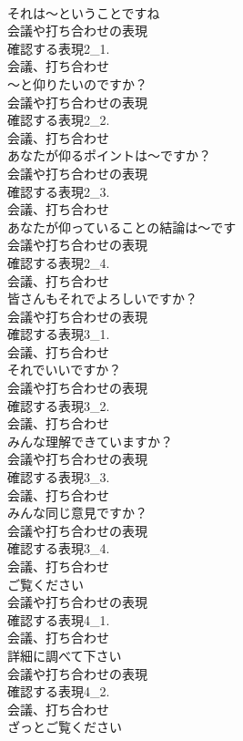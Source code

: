 \documentclass[8pt]{extreport}
\begin{document}
\begin{CJK}{UTF8}{min}
\\	それは～ということですね	
\\	会議や打ち合わせの表現
\\	確認する表現2_1.
\\	会議、打ち合わせ
\\	～と仰りたいのですか？	
\\	会議や打ち合わせの表現
\\	確認する表現2_2.
\\	会議、打ち合わせ
\\	あなたが仰るポイントは～ですか？	
\\	会議や打ち合わせの表現
\\	確認する表現2_3.
\\	会議、打ち合わせ
\\	あなたが仰っていることの結論は～です	
\\	会議や打ち合わせの表現
\\	確認する表現2_4.
\\	会議、打ち合わせ
\\	皆さんもそれでよろしいですか？	
\\	会議や打ち合わせの表現
\\	確認する表現3_1.
\\	会議、打ち合わせ
\\	それでいいですか？	
\\	会議や打ち合わせの表現
\\	確認する表現3_2.
\\	会議、打ち合わせ
\\	みんな理解できていますか？	
\\	会議や打ち合わせの表現
\\	確認する表現3_3.
\\	会議、打ち合わせ
\\	みんな同じ意見ですか？	
\\	会議や打ち合わせの表現
\\	確認する表現3_4.
\\	会議、打ち合わせ
\\	ご覧ください	
\\	会議や打ち合わせの表現
\\	確認する表現4_1.
\\	会議、打ち合わせ
\\	詳細に調べて下さい	
\\	会議や打ち合わせの表現
\\	確認する表現4_2.
\\	会議、打ち合わせ
\\	ざっとご覧ください	

\end{CJK}
\end{document}
